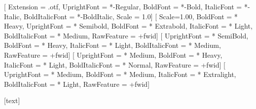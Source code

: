 \setmainfont{LibertinusSerif}[%
  Extension      = .otf,
  UprightFont    = *-Regular,
  BoldFont       = *-Bold,
  ItalicFont     = *-Italic,
  BoldItalicFont = *-BoldItalic,
  Scale          = 1.0]
\setmonofont{Iosevka Term}[%
  Scale=1.00,
  BoldFont        = * Heavy,
  UprightFont     = * Semibold,
  BoldFont        = * Extrabold,
  ItalicFont      = * Light,
  BoldItalicFont  = * Medium,
  RawFeature      = +fwid]
[ %
  UprightFont     = * SemiBold,
  BoldFont        = * Heavy,
  ItalicFont      = * Light,
  BoldItalicFont  = * Medium,
  RawFeature      = +fwid]
[ %
  UprightFont     = * Medium,
  BoldFont        = * Heavy,
  ItalicFont      = * Light,
  BoldItalicFont  = * Normal,
  RawFeature      = +fwid]  
[%
  UprightFont     = * Medium,
  BoldFont        = * Medium,
  ItalicFont      = * Extralight,
  BoldItalicFont  = * Light,
  RawFeature      = +fwid]
\newCJKfontfamily{}
\newCJKfontfamily{}
\newCJKfontfamily{}
\newCJKfontfamily{} 

{}%
{}%
[text]

